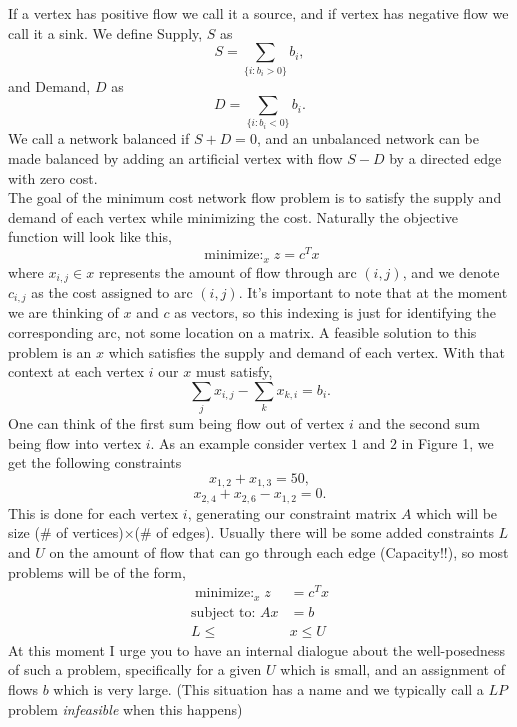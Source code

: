 \documentclass[12pt]{amsart}
\begin{document}
If a vertex has positive flow we call it a source, and if vertex has negative flow we call it a sink. 
We define Supply, $S$ as 
\begin{equation*}
  S = \sum_{\{i :b_i > 0\}}b_i,
\end{equation*}
and Demand, $D$ as
\begin{equation*}
  D = \sum_{\{i: b_i < 0\}}b_i.
\end{equation*}
We call a network balanced if $S + D = 0$, and an unbalanced network can be made balanced by adding an artificial vertex with flow $S - D$ by a directed edge with 
zero cost.\\


The goal of the minimum cost network flow problem is to satisfy the supply and demand of each vertex while minimizing the cost. Naturally the objective function will look 
like this, 
\begin{equation*}
    \mathop{\text{minimize: }}_{x}  z = c^Tx
\end{equation*}
where $x_{i,j} \in x$ represents the amount of flow through arc $(i, j)$, and we denote $c_{i, j}$ as the cost assigned to arc $(i, j)$. It's important to note that at the moment we are thinking of $x$ and $c$ as vectors, so this indexing is just for identifying 
the corresponding arc, not some location on a matrix. A feasible solution to this problem is an $x$ which satisfies the supply and demand of each vertex. 
With that context at each vertex $i$ our $x$ must satisfy, 
\begin{equation*}
  \sum_{j}x_{i, j} - \sum_{k}x_{k, i} = b_i.
\end{equation*} 
One can think of the first sum being flow out of vertex $i$ and the second sum being flow into vertex $i$. As an example consider vertex $1$ and $2$ in Figure 1, 
we get the following constraints
\begin{equation*}
  x_{1, 2} + x_{1,3} = 50,
\end{equation*}
\begin{equation*}
  x_{2, 4} + x_{2, 6} - x_{1, 2} = 0.
\end{equation*}
This is done for each vertex $i$, generating our constraint matrix $A$ which will be size (\# of vertices)$ \times $(\# of edges). Usually there will be some added constraints $L$ and $U$ on the amount of flow that can go through each edge (Capacity!!), so most problems will be of the form, 
\begin{align*}
    \mathop{\text{minimize: }}_{x}  z &= c^Tx\\
  \text{subject to: }Ax &= b\\
  L \leq&x\leq U
\end{align*}
At this moment I urge you to have an internal dialogue about the well-posedness of such a problem, specifically for a given $U$ which is small, and an assignment of flows $b$ which is very large. (This situation has a name and we typically call a $LP$ problem \emph{infeasible} when this happens)
\end{document}
